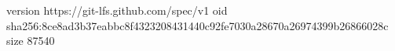 version https://git-lfs.github.com/spec/v1
oid sha256:8ce8ad3b37eabbc8f4323208431440c92fe7030a28670a26974399b26866028c
size 87540
